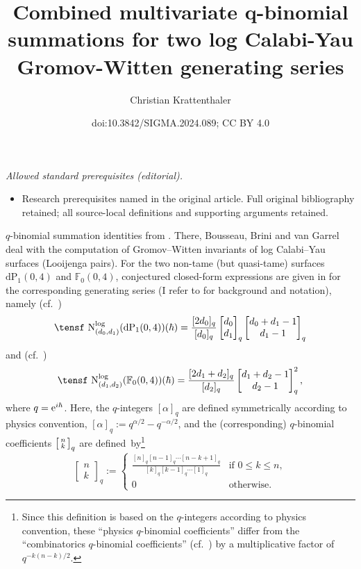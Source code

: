 \documentclass[10pt,a4paper]{amsart}
\title{Combined multivariate q-binomial summations for two log Calabi-Yau Gromov-Witten generating series}
\author{Christian Krattenthaler}
\date{doi:10.3842/SIGMA.2024.089; CC BY 4.0}
\def\al{\alpha}
\begin{document}
\maketitle
\noindent\textit{Allowed standard prerequisites (editorial).}\begin{itemize}
\item Research prerequisites named in the original article. Full original bibliography retained; all source-local definitions and supporting arguments retained.
\end{itemize}\medskip
$q$-binomial summation identities from \cite{BoBGAA}. There,
Bousseau, Brini and van Garrel deal with the computation of
Gromov--Witten invariants of log Calabi--Yau surfaces (Looijenga pairs).
For the two non-tame (but quasi-tame) surfaces $\text{dP}_1(0,4)$
and $\mathbb F_0(0,4)$, conjectured closed-form expressions are given
in \cite{BoBGAA} for the
corresponding generating series
(I refer to \cite{BoBGAA} for background and notation), namely
(cf.~\mbox{\cite[Conjecture~B.3, equation~(B-2)]{BoBGAA}})
\begin{equation} \label{AA}
\text{\tensf N}_{(d_0,d_1)}^{\log}(\text{dP}_1(0,4))(\hbar)
=
\frac {[2d_0]_q} {[d_0]_q}
\begin{bmatrix} d_0\\d_1\end{bmatrix}_q
\begin{bmatrix} d_0+d_1-1\\d_1-1\end{bmatrix}_q
\end{equation}
and (cf.~\cite[Conjecture~B.3, equation~(B-3)]{BoBGAA})
\begin{equation} \label{AB}
\text{\tensf N}_{(d_1,d_2)}^{\log}(\mathbb F_0(0,4))(\hbar)
=
\frac {[2d_1+d_2]_q} {[d_2]_q}\begin{bmatrix} d_1+d_2-1\\d_2-1\end{bmatrix}_q^2,
\end{equation}
where $q={\rm e}^{i\hbar}$.
Here, the $q$-integers $[\al]_q$ are defined symmetrically according
to physics convention, $[\al]_q:=q^{\al/2}-q^{-\al/2}$, and
the (corresponding) $q$-binomial coefficients
$\bigl[\smallmatrix n\\k\endsmallmatrix\bigr]_q$ are defined~by\footnote{Since this definition is based on the
$q$-integers according to physics convention,
these ``physics $q$-binomial coefficients'' differ
from the ``combinatorics $q$-binomial coefficients'' (cf.\
\cite[Exercise~1.2]{GaRaAF})
by a multiplicative factor of~${q^{-k(n-k)/2}}$.}
\begin{equation*}
\begin{bmatrix} n\\k\end{bmatrix}_q:=\begin{cases} \displaystyle
\frac {[n]_q[n-1]_q\cdots[n-k+1]_q} {[k]_q[k-1]_q\cdots[1]_q}
&\text{if }0\le k\le n,\\
0&\text{otherwise.}\end{cases}
\end{equation*}
\end{document}
